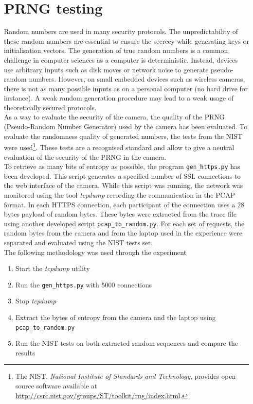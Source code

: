 \section{PRNG testing}
\label{sec:dcs-random}

Random numbers are used in many security protocols.
The unpredictability of these random numbers are essential to ensure the secrecy while generating keys or initialisation vectors.
The generation of true random numbers is a common challenge in computer sciences as a computer is deterministic.
Instead, devices use arbitrary inputs such as disk moves or network noise to generate pseudo-random numbers.
However, on small embedded devices such as wireless cameras, there is not as many possible inputs as on a personal computer (no hard drive for instance).
A weak random generation procedure may lead to a weak usage of theoretically secured protocols.\\

As a way to evaluate the security of the camera, the quality of the PRNG (Pseudo-Random Number Generator) used by the camera has been evaluated.
To evaluate the randomness quality of generated numbers, the tests from the NIST were used\footnote{The NIST, \emph{National Institute of Standards and Technology}, provides open source software available at \url{http://csrc.nist.gov/groups/ST/toolkit/rng/index.html}.}.
These tests are a recognised standard and allow to give a neutral evaluation of the security of the PRNG in the camera.\\

To retrieve as many bits of entropy as possible, the program \texttt{gen\_https.py} has been developed.%
This script generates a specified number of SSL connections to the web interface of the camera.
While this script was running, the network was monitored using the tool \emph{tcpdump} recording the communication in the PCAP format.
In each HTTPS connection, each participant of the connection uses a 28 bytes payload of random bytes.
These bytes were extracted from the trace file using another developed script \texttt{pcap\_to\_random.py}.
For each set of requests, the random bytes from the camera and from the laptop used in the experience were separated and evaluated using the NIST tests set.\\

The following methodology was used through the experiment

\begin{enumerate}
\item Start the \emph{tcpdump} utility
\item Run the \texttt{gen\_https.py} with 5000 connections
\item Stop \emph{tcpdump}
\item Extract the bytes of entropy from the camera and the laptop using \texttt{pcap\_to\_random.py}
\item Run the NIST tests on both extracted random sequences and compare the results
\end{enumerate}

